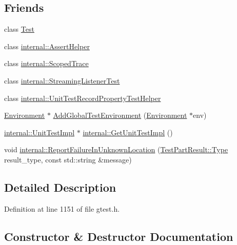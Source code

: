 \subsection*{Friends}
\begin{DoxyCompactItemize}
\item 
class \hyperlink{classtesting_1_1UnitTest_a5b78b1c2e1fa07ffed92da365593eaa4}{Test}
\item 
class \hyperlink{classtesting_1_1UnitTest_a183151aa061362c87572e743fe233db1}{internal\+::\+Assert\+Helper}
\item 
class \hyperlink{classtesting_1_1UnitTest_afa3927576c08d7b1e197ba16b2b3dcb7}{internal\+::\+Scoped\+Trace}
\item 
class \hyperlink{classtesting_1_1UnitTest_adc037d188dab349a94868991955c9cd4}{internal\+::\+Streaming\+Listener\+Test}
\item 
class \hyperlink{classtesting_1_1UnitTest_ae970f89a9f477a349fe5778be85ef42e}{internal\+::\+Unit\+Test\+Record\+Property\+Test\+Helper}
\item 
\hyperlink{classtesting_1_1Environment}{Environment} $\ast$ \hyperlink{classtesting_1_1UnitTest_a5ec26e4c31220ff8e769cc09689a4d6d}{Add\+Global\+Test\+Environment} (\hyperlink{classtesting_1_1Environment}{Environment} $\ast$env)
\item 
\hyperlink{classtesting_1_1internal_1_1UnitTestImpl}{internal\+::\+Unit\+Test\+Impl} $\ast$ \hyperlink{classtesting_1_1UnitTest_a56e56be7066957d612e53b5c60f6ac08}{internal\+::\+Get\+Unit\+Test\+Impl} ()
\item 
void \hyperlink{classtesting_1_1UnitTest_a73f5a158c13793b90c80d854c9a75120}{internal\+::\+Report\+Failure\+In\+Unknown\+Location} (\hyperlink{classtesting_1_1TestPartResult_a65ae656b33fdfdfffaf34858778a52d5}{Test\+Part\+Result\+::\+Type} result\+\_\+type, const std\+::string \&message)
\end{DoxyCompactItemize}


\subsection{Detailed Description}


Definition at line 1151 of file gtest.\+h.



\subsection{Constructor \& Destructor Documentation}
\mbox{\label{classtesting_1_1UnitTest_a5e646d37f980429c310af696c8775f5c}} 
